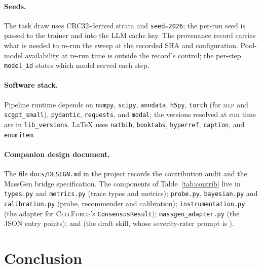 \documentclass[10pt,a4paper]{article}
\begin{document}
\paragraph{Seeds.} The task draw uses CRC32-derived strata and
\texttt{seed=2026}; the per-run seed is passed to the trainer and into the
LLM cache key. The provenance record carries what is needed to re-run the
sweep at the recorded SHA and configuration. Pool-model availability at
re-run time is outside the record's control; the per-step
\texttt{model\_id} states which model served each step.

\paragraph{Software stack.} Pipeline runtime depends on \texttt{numpy},
\texttt{scipy}, \texttt{anndata}, \texttt{h5py}, \texttt{torch} (for
\textsc{mlp} and \texttt{scgpt\_small}), \texttt{pydantic}, \texttt{requests},
and \texttt{modal}; the versions resolved at run time are in
\texttt{lib\_versions}. LaTeX uses \texttt{natbib}, \texttt{booktabs},
\texttt{hyperref}, \texttt{caption}, and \texttt{enumitem}.

\paragraph{Companion design document.} The file \texttt{docs/DESIGN.md} in
the project records the contribution audit and the MassGen bridge
specification. The components of Table~\ref{tab:contrib} live in
\texttt{types.py} and \texttt{metrics.py} (trace types and metrics);
\texttt{probe.py}, \texttt{bayesian.py} and \texttt{calibration.py} (probe,
recommender and calibration); \texttt{instrumentation.py} (the adapter for
\textsc{CellForge}'s \texttt{ConsensusResult}); \texttt{massgen\_adapter.py} (the
JSON entry points); and  (the draft skill, whose
severity-rater prompt is ).

\section{Conclusion}\label{sec:conclusion}
\end{document}
